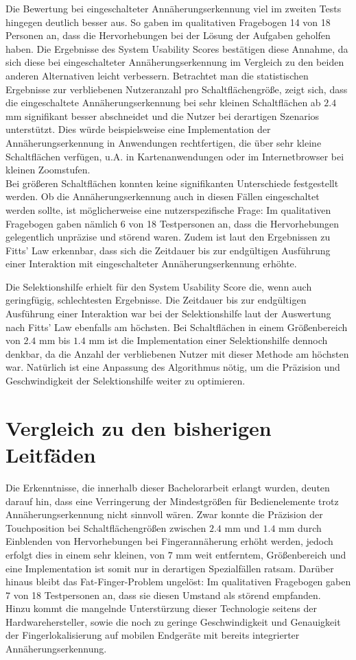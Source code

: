 \documentclass[12pt,numbers=noenddot,parskip,bibliography=totocnumbered,listof=totocnumbered]{scrreprt}
\begin{document}
Die Bewertung bei eingeschalteter Annäherungserkennung viel im zweiten Tests hingegen deutlich besser aus. So gaben im qualitativen Fragebogen 14 von 18 Personen an, dass die Hervorhebungen bei der Lösung der Aufgaben geholfen haben. Die Ergebnisse des System Usability Scores bestätigen diese Annahme, da sich diese bei eingeschalteter Annäherungserkennung im Vergleich zu den beiden anderen Alternativen leicht verbessern. Betrachtet man die statistischen Ergebnisse zur verbliebenen Nutzeranzahl pro Schaltflächengröße, zeigt sich, dass die eingeschaltete Annäherungserkennung bei sehr kleinen Schaltflächen ab $2.4$ mm signifikant besser abschneidet und die Nutzer bei derartigen Szenarios unterstützt. Dies würde beispielsweise eine Implementation der Annäherungserkennung in Anwendungen rechtfertigen, die über sehr kleine Schaltflächen verfügen, u.A. in Kartenanwendungen oder im Internetbrowser bei kleinen Zoomstufen.\\
Bei größeren Schaltflächen konnten keine signifikanten Unterschiede festgestellt werden. Ob die Annäherungserkennung auch in diesen Fällen eingeschaltet werden sollte, ist möglicherweise eine nutzerspezifische Frage: Im qualitativen Fragebogen gaben nämlich 6 von 18 Testpersonen an, dass die Hervorhebungen gelegentlich unpräzise und störend waren. Zudem ist laut den Ergebnissen zu Fitts' Law erkennbar, dass sich die Zeitdauer bis zur endgültigen Ausführung einer Interaktion mit eingeschalteter Annäherungserkennung erhöhte.

Die Selektionshilfe erhielt für den System Usability Score die, wenn auch geringfügig, schlechtesten Ergebnisse. Die Zeitdauer bis zur endgültigen Ausführung einer Interaktion war bei der Selektionshilfe laut der Auswertung nach Fitts' Law ebenfalls am höchsten. Bei Schaltflächen in einem Größenbereich von $2.4$ mm bis $1.4$ mm ist die Implementation einer Selektionshilfe dennoch denkbar, da die Anzahl der verbliebenen Nutzer mit dieser Methode am höchsten war. Natürlich ist eine Anpassung des Algorithmus nötig, um die Präzision und Geschwindigkeit der Selektionshilfe weiter zu optimieren.

\section{Vergleich zu den bisherigen Leitfäden}
Die Erkenntnisse, die innerhalb dieser Bachelorarbeit erlangt wurden, deuten darauf hin, dass eine Verringerung der Mindestgrößen für Bedienelemente trotz Annäherungserkennung nicht sinnvoll wären. Zwar konnte die Präzision der Touchposition bei Schaltflächengrößen zwischen $2.4$ mm und $1.4$ mm durch Einblenden von Hervorhebungen bei Fingerannäherung erhöht werden, jedoch erfolgt dies in einem sehr kleinen, von $7$ mm weit entferntem, Größenbereich und eine Implementation ist somit nur in derartigen Spezialfällen ratsam. Darüber hinaus bleibt das Fat-Finger-Problem ungelöst: Im qualitativen Fragebogen gaben 7 von 18 Testpersonen an, dass sie diesen Umstand als störend empfanden.\\
Hinzu kommt die mangelnde Unterstürzung dieser Technologie seitens der Hardwarehersteller, sowie die noch zu geringe Geschwindigkeit und Genauigkeit der Fingerlokalisierung auf mobilen Endgeräte mit bereits integrierter Annäherungserkennung.
\end{document}
